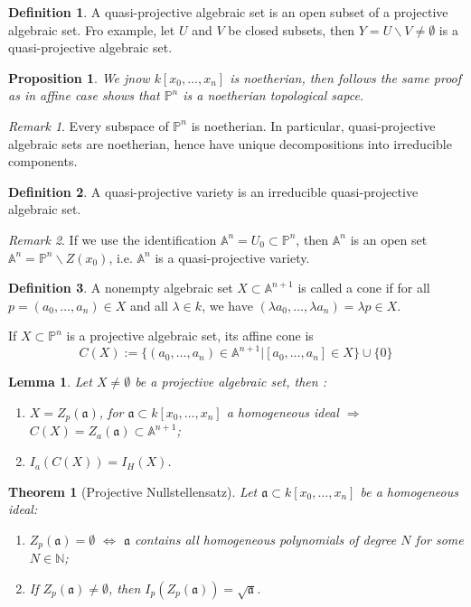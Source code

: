 \documentclass{amsart}
\theoremstyle{plain}
\newtheorem{theorem}{Theorem}
\newtheorem{lemma}{Lemma}
\newtheorem{proposition}{Proposition}
\theoremstyle{definition}
\newtheorem{definition}{Definition}
\theoremstyle{remark}
\newtheorem*{remark}{Remark}
\numberwithin{equation}{section}
\begin{document}
\begin{definition}
	A quasi-projective algebraic set is an open subset of a projective algebraic set. Fro example, let $ U $ and $ V $ be closed subsets, then $ Y=U\backslash V\neq \emptyset $ is a quasi-projective algebraic set.
\end{definition}
\begin{proposition}
	We jnow $ k[x_0,\dots,x_n] $ is noetherian, then follows the same proof as in affine case shows that $ \mathbb{P}^n $ is a noetherian topological sapce.
\end{proposition}
\begin{remark}
	Every subspace of $ \mathbb{P}^n $ is noetherian. In particular, quasi-projective algebraic sets are noetherian, hence have unique decompositions into irreducible components.
\end{remark}
\begin{definition}
	A quasi-projective variety is an irreducible quasi-projective algebraic set.
\end{definition}
\begin{remark}
	If we use the identification $ \mathbb{A}^n=U_0\subset \mathbb{P}^n $, then $ \mathbb{A}^n $ is an open set $ \mathbb{A}^n=\mathbb{P}^n\backslash Z(x_0) $, i.e. $ \mathbb{A}^n $ is a quasi-projective variety.
\end{remark}
\begin{definition}
	A nonempty algebraic set $ X\subset \mathbb{A}^{n+1} $ is called a cone if for all $ p=(a_0,\dots,a_n)\in X $ and all $ \lambda \in k $, we have $ (\lambda a_0,\dots,\lambda a_n)=\lambda p\in X $.
	
	If $ X\subset \mathbb{P}^n $ is a projective algebraic set, its affine cone is
	\begin{equation}
	C(X):=\{ (a_0,\dots,a_n)\in \mathbb{A}^{n+1}|[a_0,\dots,a_n]\in X \}\cup\{ 0 \}
	\end{equation}
\end{definition}
\begin{lemma}
	Let $ X\neq\emptyset $ be a projective algebraic set, then :
	\begin{enumerate}
		\item $ X=Z_p(\mathfrak{a}) $, for $ \mathfrak{a}\subset k[x_0,\dots,x_n]$ a   homogeneous ideal $ \Rightarrow $ $ C(X)=Z_a(\mathfrak{a})\subset \mathbb{A}^{n+1} $;
		\item $ I_a(C(X))=I_H(X) $.
	\end{enumerate}
\end{lemma}
\begin{theorem}[Projective Nullstellensatz]
	Let $ \mathfrak{a}\subset k[x_0,\dots,x_n] $ be a homogeneous ideal:
	\begin{enumerate}
		\item $ Z_p(\mathfrak{a})=\emptyset $ $ \Leftrightarrow $ $ \mathfrak{a} $ contains all homogeneous polynomials of degree $ N $ for some $ N\in \mathbb{N} $;
		\item If $ Z_p(\mathfrak{a})\neq \emptyset $, then $ I_p(Z_p(\mathfrak{a}))=\sqrt{\mathfrak{a}} $.
	\end{enumerate}
\end{theorem}
\end{document}

